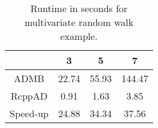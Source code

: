 \begin{table}[ht]
\centering
\begin{tabular}{cccc}
  \hline
 & 3 & 5 & 7 \\ 
  \hline
ADMB & 22.74 & 55.93 & 144.47 \\ 
  RcppAD & 0.91 & 1.63 & 3.85 \\ 
  Speed-up & 24.88 & 34.34 & 37.56 \\ 
   \hline
\end{tabular}
\caption{Runtime in seconds for multivariate random walk example.} 
\end{table}
